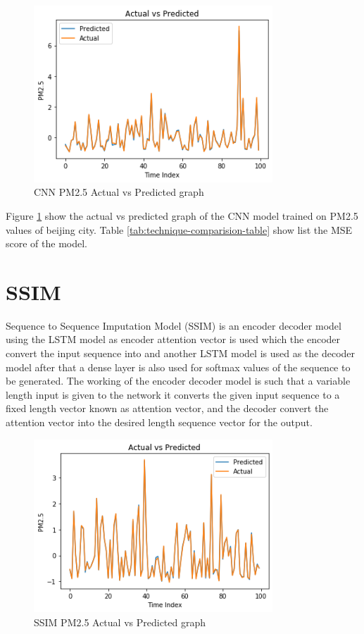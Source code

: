 \begin{figure}[ht]
	\centering
	\includegraphics[width=0.8\textwidth]{images/techniques/cnn.png}
	\caption{CNN PM2.5 Actual vs Predicted graph}
	\label{fig:cnn-tech}
\end{figure}

Figure \ref{fig:cnn-tech} show the actual vs predicted graph of the CNN model trained on PM2.5 values of beijing city. Table \ref{tab:technique-comparision-table} show list the MSE score of the model.

\section{SSIM}
Sequence to Sequence Imputation Model (SSIM) is an encoder decoder model using the LSTM model as encoder attention vector is used which the encoder convert the input sequence into and another LSTM model is used as the decoder model after that a dense layer is also used for softmax values of the sequence to be generated. The working of the encoder decoder model is such that a variable length input is given to the network it converts the given input sequence to a fixed length vector known as attention vector, and the decoder convert the attention vector into the desired length sequence vector for the output.

\begin{figure}[ht]
	\centering
	\includegraphics[width=0.8\textwidth]{images/techniques/ssim.png}
	\caption{SSIM PM2.5 Actual vs Predicted graph}
	\label{fig:ssim-tech}
\end{figure}

